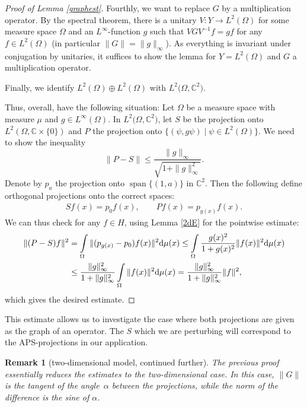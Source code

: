 \documentclass[10pt,a4paper]{amsart}
\numberwithin{equation}{section}
\newtheorem{Remark}[Theorem]{Remark} }
\DeclareMathOperator{\spann}{span}
\begin{document}
\begin{proof}[Proof of Lemma \ref{graphest}]
		Fourthly, we want to replace $G$ by a multiplication operator. By the spectral theorem, there is a unitary $V\colon Y\to L^2(\Omega)$ for some measure space $\Omega$ and an $L^\infty$-function $g$ such that $VGV^{-1}f=gf$ for any $f\in L^2(\Omega)$ (in particular $\|G\|=\|g\|_\infty$). As everything is invariant under conjugation by unitaries, it suffices to show the lemma for $Y=L^2(\Omega)$ and $G$ a multiplication operator.
		
		Finally, we identify $L^2(\Omega)\oplus L^2(\Omega)$ with $L^2\bigl(\Omega,\mathbb{C}^2\bigr)$.
		
		Thus, overall, have the following situation: Let $\Omega$ be a measure space with measure $\mu$ and $g\in L^\infty(\Omega)$. In $L^2\bigl(\Omega, \mathbb{C}^2\bigr)$, let $S$ be the projection onto $L^2(\Omega,\mathbb{C}\times\{0\})$ and $P$ the projection onto $\bigl\{(\psi,g\psi)\mid \psi\in L^2(\Omega)\bigr\}$. We need to show the inequality
		\[
        \|P-S\|\leq \frac{\|g\|_\infty}{\sqrt{1+\|g\|_\infty^2}}.
        \]
		Denote by $p_a$ the projection onto $\spann\{(1,a)\}$ in $\mathbb{C}^2$. Then the following define orthogonal projections onto the correct spaces:
		\begin{gather*}
        Sf(x)=p_0f(x),\qquad
        Pf(x)=p_{g(x)}f(x).
        \end{gather*}
		We can thus check for any $f\in H$, using Lemma \ref{2dE} for the pointwise estimate:
		\begin{align*}
			\|(P-S)f\|^2
			&=\int\limits_\Omega\|(p_{g(x)}-p_0)f(x)\|^2{\rm d}\mu(x)
			 \leq\int\limits_\Omega\frac{g(x)^2}{1+g(x)^2}\|f(x)\|^2{\rm d}\mu(x)\\
			&\leq\frac{\|g\|_\infty^2}{1+\|g\|_\infty^2}\int\limits_\Omega\|f(x)\|^2{\rm d}\mu(x)
			 =\frac{\|g\|_\infty^2}{1+\|g\|_\infty^2}\|f\|^2,
		\end{align*}
		which gives the desired estimate.
	\end{proof}
	
	This estimate allows us to investigate the case where both projections are given as the graph of an operator. The $S$ which we are perturbing will correspond to the APS-projections in our application.
	\begin{Remark}[two-dimensional model, continued further]
		The previous proof essentially reduces the estimates to the two-dimensional case. In this case, $\|G\|$ is the tangent of the angle~$\alpha$ between the projections, while the norm of the difference is the sine of $\alpha$.
			\end{Remark}
\end{document}
